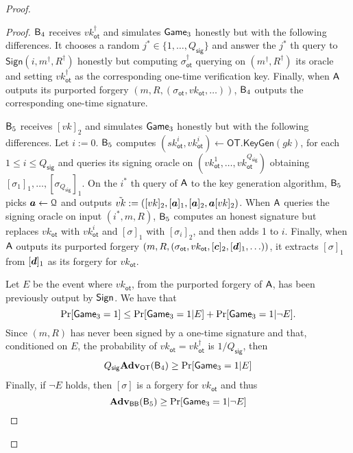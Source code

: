 \begin{proof}
\begin{proof}
$\mathsf{B}_4$ receives $vk_\mathsf{ot}^\dag$ and simulates $\mathsf{Game}_3$ honestly but with the following differences. It chooses a random $j^*\in\{1,\ldots, Q_\mathsf{sig}\}$ and answer the $j^*$ th query to $\mathsf{Sign}(i,m^\dag,R^\dag)$ honestly but computing $\sigma_\mathsf{ot}^\dag$ querying on $(m^\dag,R^\dag)$ its oracle and setting $vk_\mathsf{ot}^\dag$ as the corresponding one-time verification key. Finally, when $\mathsf{A}$ outputs its purported forgery $(m,R,(\sigma_\mathsf{ot},vk_\mathsf{ot},\ldots))$, $\mathsf{B}_4$ outputs the corresponding one-time signature.

$\mathsf{B}_5$ receives $[vk]_2$ and simulates $\mathsf{Game}_3$ honestly but with the following differences. Let $i:=0$. $\mathsf{B}_5$ computes $(sk_\mathsf{ot}^i,vk_\mathsf{ot}^i)\gets\mathsf{OT}.\mathsf{KeyGen}(gk)$, for each $1\leq i\leq Q_\mathsf{sig}$ and queries its signing oracle on $(vk_{\mathsf{ot}}^1,\ldots,vk_\mathsf{ot}^{Q_{\mathsf{sig}}})$ obtaining $[\sigma_1]_1,\ldots,[\sigma_{Q_\mathsf{sig}}]_1$. On the $i^*$ th query of $\mathsf{A}$ to the key generation algorithm, $\mathsf{B}_5$ picks ${\boldsymbol{a}}\gets\mathcal{Q}$ and outputs $\tilde{vk}:=([vk]_2,[{\boldsymbol{a}}]_1,[{\boldsymbol{a}}]_2,{\boldsymbol{a}}[vk]_2)$. When $\mathsf{A}$ queries the signing oracle on input $(i^*,m,R)$, $\mathsf{B}_5$ computes an honest signature but replaces $vk_\mathsf{ot}$ with $vk_\mathsf{ot}^i$ and $[\sigma]_1$ with $[\sigma_i]_2$, and then adds 1 to $i$. Finally, when $\mathsf{A}$ outputs its purported forgery $(m,R,(\sigma_\mathsf{ot},vk_\mathsf{ot},[{\boldsymbol{c}}]_2,[{\boldsymbol{d}}]_1,\ldots))$, it extracts $[\sigma]_1$ from $[{\boldsymbol{d}}]_1$ as its forgery for $vk_\mathsf{ot}$.

Let $E$ be the event where $vk_\mathsf{ot}$, from the purported forgery of $\mathsf{A}$, has been previously output by $\mathsf{Sign}$. We have that
$$
\Pr[\mathsf{Game}_3=1]\leq \Pr[\mathsf{Game}_3=1|E]+\Pr[\mathsf{Game}_3=1|\neg E].
$$
Since  $(m,R)$ has never been signed by a one-time signature and that, conditioned on $E$, the probability of $vk_\mathsf{ot}=vk_\mathsf{ot}^\dag$ is $1/Q_\mathsf{sig}$, then
\begin{align*}
Q_{\mathsf{sig}}\mathbf{Adv}_\mathsf{OT}(\mathsf{B}_4)\geq  \Pr[\mathsf{Game}_3=1|E]
\end{align*}
Finally, if $\neg E$ holds, then $[\sigma]$ is a forgery for $vk_\mathsf{ot}$ and thus
$$
\mathbf{Adv}_{\mathsf{BB}}(\mathsf{B}_5)\geq \Pr[\mathsf{Game}_3=1|\neg E]$$
\end{proof}
\end{proof}